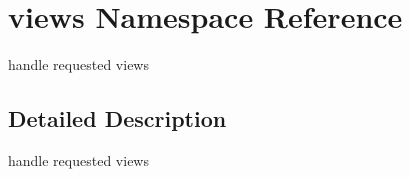 \hypertarget{namespaceviews}{}\section{views Namespace Reference}
\label{namespaceviews}


handle requested views  




\subsection{Detailed Description}
handle requested views 